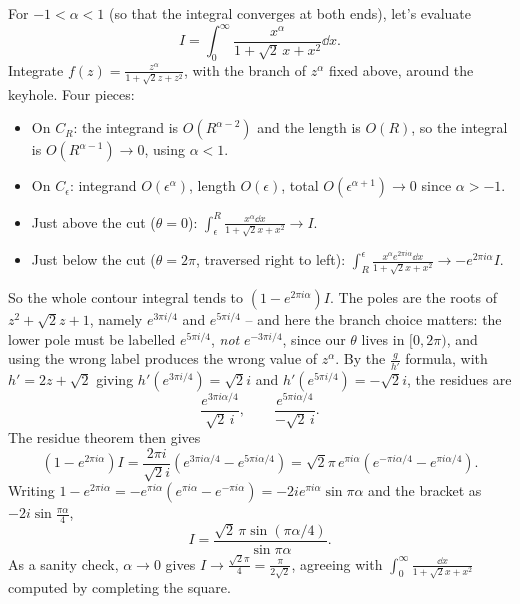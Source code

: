 \begin{example}
	For $-1 < \alpha < 1$ (so that the integral converges at both ends), let's evaluate
	$$
	I = \int_0^\infty \frac{x^\alpha}{1 + \sqrt 2\, x + x^2} \dd x.
	$$
	Integrate $f(z) = \frac{z^\alpha}{1 + \sqrt 2 z + z^2}$, with the branch of $z^\alpha$ fixed above, around the keyhole. Four pieces:
	\begin{itemize}
		\item On $C_R$: the integrand is $O(R^{\alpha - 2})$ and the length is $O(R)$, so the integral is $O(R^{\alpha - 1}) \to 0$, using $\alpha < 1$.
		\item On $C_\epsilon$: integrand $O(\epsilon^\alpha)$, length $O(\epsilon)$, total $O(\epsilon^{\alpha + 1}) \to 0$ since $\alpha > -1$.
		\item Just above the cut ($\theta = 0$): $\displaystyle \int_\epsilon^R \frac{x^\alpha \dd x}{1 + \sqrt 2 x + x^2} \to I$.
		\item Just below the cut ($\theta = 2\pi$, traversed right to left): $\displaystyle \int_R^\epsilon \frac{x^\alpha e^{2\pi i \alpha} \dd x}{1 + \sqrt 2 x + x^2} \to -e^{2\pi i \alpha} I$.
	\end{itemize}
	So the whole contour integral tends to $(1 - e^{2\pi i \alpha}) I$. The poles are the roots of $z^2 + \sqrt 2 z + 1$, namely $e^{3\pi i/4}$ and $e^{5\pi i /4}$ -- and here the branch choice matters: the lower pole must be labelled $e^{5\pi i/4}$, \emph{not} $e^{-3\pi i /4}$, since our $\theta$ lives in $[0, 2\pi)$, and using the wrong label produces the wrong value of $z^\alpha$. By the $\frac{g}{h'}$ formula, with $h' = 2z + \sqrt 2$ giving $h'(e^{3\pi i/4}) = \sqrt 2 i$ and $h'(e^{5\pi i /4}) = -\sqrt 2 i$, the residues are
	$$
	\frac{e^{3\pi i \alpha/4}}{\sqrt 2\, i}, \qquad \frac{e^{5\pi i \alpha /4}}{-\sqrt 2\, i}.
	$$
	The residue theorem then gives
	$$
	(1 - e^{2\pi i \alpha}) I = \frac{2\pi i}{\sqrt 2 i}\left(e^{3\pi i\alpha/4} - e^{5\pi i \alpha/4}\right) = \sqrt 2 \pi \, e^{\pi i \alpha}\left(e^{-\pi i \alpha/4} - e^{\pi i \alpha/4}\right).
	$$
	Writing $1 - e^{2\pi i \alpha} = -e^{\pi i \alpha}(e^{\pi i \alpha} - e^{-\pi i \alpha}) = -2ie^{\pi i \alpha}\sin \pi\alpha$ and the bracket as $-2i \sin\frac{\pi\alpha}{4}$,
	$$
	I = \frac{\sqrt 2 \, \pi \sin(\pi\alpha/4)}{\sin \pi \alpha}.
	$$
	As a sanity check, $\alpha \to 0$ gives $I \to \frac{\sqrt 2 \pi}{4} = \frac{\pi}{2\sqrt 2}$, agreeing with $\int_0^\infty \frac{\dd x}{1 + \sqrt 2 x + x^2}$ computed by completing the square.
\end{example}

